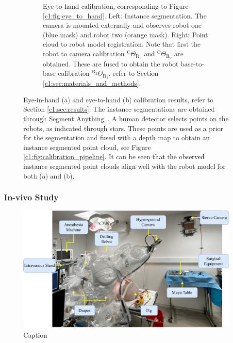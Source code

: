 \begin{figure}
\begin{subfigure}[b]{\textwidth}
         \caption{Eye-to-hand calibration, corresponding to Figure \ref{c1:fig:eye_to_hand}. Left: Instance segmentation. The camera is mounted externally and observes robot one (blue mask) and robot two (orange mask). Right: Point cloud to robot model registration. Note that first the robot to camera calibration $^\text{C}\Theta_{\text{R}_1}$ and $^\text{C}\Theta_{\text{R}_2}$ are obtained. These are fused to obtain the robot base-to-base calibration $^{\text{R}_2}\Theta_{\text{R}_1}$, refer to Section \ref{c1:sec:materials_and_methods}.}
         \label{c1:fig:double_registration}
     \end{subfigure}
     \caption{Eye-in-hand (a) and eye-to-hand (b) calibration results, refer to Section \ref{c1:sec:results}. The instance segmentations are obtained through Segment Anything~\citep{segment_anything}. A human detector selects points on the robots, as indicated through stars. These points are used as a prior for the segmentation and fused with a depth map to obtain an instance segmented point cloud, see Figure \ref{c1:fig:calibration_pipeline}. It can be seen that the observed instance segmented point clouds align well with the robot model for both (a) and (b).}
     \label{c1:fig:registration_results}
\end{figure}


\subsubsection{In-vivo Study}


\begin{figure}
    \centering
    \includegraphics[width=\textwidth]{chapter_1/img/in_vivo_setup.pdf}
    \caption{Caption}
    \label{c1:fig:in_vivo_setup}
\end{figure}

